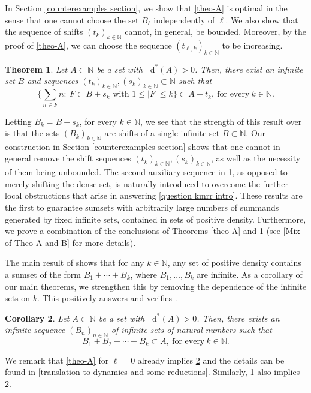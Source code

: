 \documentclass[letter, 11pt]{article}
\newtheorem{thmx}{Theorem}
\newtheorem{corox}[thmx]{Corollary}
\theoremstyle{definition}
\theoremstyle{plain}
\newcommand{\N}{\mathbb{N}}
\newcommand*\diff{\mathop{}\!\mathrm{d}}
\newcommand{\1}{\mathbbm{1}}
\begin{document}
In Section \ref{counterexamples section}, we show that 
\cref{theo-A} is optimal in the sense that one cannot choose the set 
$B_{\ell}$ independently of $\ell$. 
We also show that the sequence of shifts $(t_k)_{k \in \N}$ cannot, in general, be bounded. Moreover, by the proof of \cref{theo-A}, we can choose the sequence $(t_{\ell,k})_{k \in \N}$ to be increasing.

\begin{thmx}\label{theo-B}
    Let $A\subset\N$ be a set with $\diff^*(A)>0$. Then, there exist an infinite set $B$ and sequences $ (t_k)_{k\in \N}, 
    (s_k)_{k\in \N} \subset \N$ such that
    $$ \bigg\{ \sum_{n\in F} n \colon \ F\subset B+s_k \text{ with } 1\leq |F|\leq k \bigg\} \subset A-t_k ,\ \text{for every}\ k\in \N.$$
\end{thmx}

Letting $B_k=B+s_k$, for every $k\in \N$, we see that the strength of this result over  is that the sets $(B_k)_{k\in \N}$ are shifts of a single infinite set $B\subset \N$. Our construction in Section \ref{counterexamples section} shows that one cannot in general remove the shift sequences $(t_k)_{k\in \N},(s_k)_{k\in \N}$, as well as the necessity of them being unbounded. The second auxiliary sequence in \cref{theo-B}, as opposed to merely shifting the dense set, is naturally introduced to overcome the further local obstructions that arise in answering \cref{question kmrr intro}. These results are the first to guarantee sumsets 
with arbitrarily large numbers of summands generated by
fixed infinite sets, contained in sets of positive density. Furthermore, we prove a combination of the conclusions of Theorems \ref{theo-A} 
and \ref{theo-B} (see \cref{Mix-of-Theo-A-and-B} for more details).

The main result of \cite{Kra_Moreira_Richter_Robertson:2022} shows that for any 
$k\in \N$, any set of positive density contains a sumset of the form 
$B_1+\cdots + B_k$, where $B_1,\ldots,B_k$ are infinite. As a corollary of our 
main theorems, we strengthen this by removing the dependence of the infinite sets on $k$. This 
positively answers \cite[Question 8.1]{Kra_Moreira_Richter_Robertson:2022} and 
verifies \cite[Conjecture 2.10]{Kra_Moreira_Richter_Robertson_problems}.
\begin{corox}\label{coro-C}
    Let $A\subset\N$ be a set with $\diff^*(A)>0$. Then, there exists an infinite sequence $(B_n)_{n\in \N}$ of infinite sets of natural numbers such that 
    $$B_1 + B_2 + \cdots + B_k\subset A,\ \text{for every}\ k\in \N.$$
\end{corox}
We remark that \cref{theo-A} for $\ell=0$ already implies 
\cref{coro-C} and the details can be found in 
\cref{translation to dynamics and some reductions}. Similarly, \cref{theo-B} 
also implies \cref{coro-C}.
\end{document}
